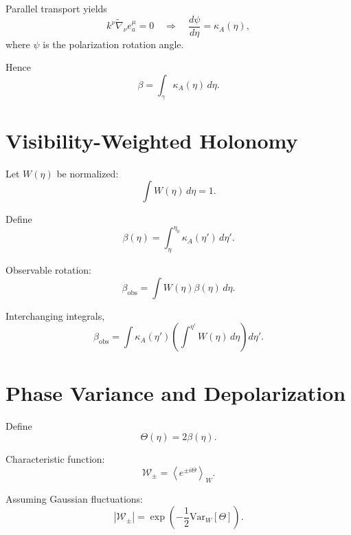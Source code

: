 \documentclass[12pt]{article}
\begin{document}
Parallel transport yields
\begin{equation}
k^\nu \tilde{\nabla}_\nu e^\mu_a = 0
\quad \Longrightarrow \quad
\frac{d\psi}{d\eta} = \kappa_A(\eta),
\end{equation}
where $\psi$ is the polarization rotation angle.

Hence
\begin{equation}
\beta
=
\int_{\gamma}
\kappa_A(\eta)\, d\eta.
\end{equation}

\section{Visibility-Weighted Holonomy}

Let $W(\eta)$ be normalized:
\begin{equation}
\int W(\eta)\, d\eta = 1.
\end{equation}

Define
\begin{equation}
\beta(\eta)
=
\int_{\eta}^{\eta_0}
\kappa_A(\eta')\, d\eta'.
\end{equation}

Observable rotation:
\begin{equation}
\beta_{\mathrm{obs}}
=
\int W(\eta)\beta(\eta)\, d\eta.
\end{equation}

Interchanging integrals,
\begin{equation}
\beta_{\mathrm{obs}}
=
\int \kappa_A(\eta')
\left(
\int^{\eta'} W(\eta)\, d\eta
\right)
d\eta'.
\end{equation}

\section{Phase Variance and Depolarization}

Define
\begin{equation}
\Theta(\eta)
=
2\beta(\eta).
\end{equation}

Characteristic function:
\begin{equation}
\mathcal{W}_\pm
=
\left\langle
e^{\pm i \Theta}
\right\rangle_W.
\end{equation}

Assuming Gaussian fluctuations:
\begin{equation}
|\mathcal{W}_\pm|
=
\exp
\left(
-\frac{1}{2}
\mathrm{Var}_W[\Theta]
\right).
\end{equation}
\end{document}
